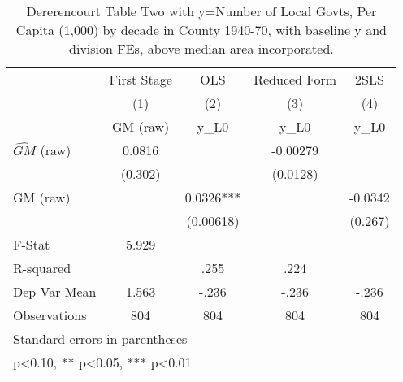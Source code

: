 \begin{table}[htbp]\centering
\def\sym#1{\ifmmode^{#1}\else\(^{#1}\)\fi}
\caption{Dererencourt Table Two with y=Number of Local Govts, Per Capita (1,000) by decade in County 1940-70, with baseline y and division FEs, above median area incorporated.}
\begin{tabular}{l*{4}{c}}
\toprule
                    & First Stage   &         OLS   &Reduced Form   &        2SLS   \\
                    &\multicolumn{1}{c}{(1)}&\multicolumn{1}{c}{(2)}&\multicolumn{1}{c}{(3)}&\multicolumn{1}{c}{(4)}\\
                    &\multicolumn{1}{c}{GM  (raw)}&\multicolumn{1}{c}{y\_L0}&\multicolumn{1}{c}{y\_L0}&\multicolumn{1}{c}{y\_L0}\\
\midrule
$\hat{GM}$ (raw)    &      0.0816   &               &    -0.00279   &               \\
                    &     (0.302)   &               &    (0.0128)   &               \\
\addlinespace
GM  (raw)           &               &      0.0326***&               &     -0.0342   \\
                    &               &   (0.00618)   &               &     (0.267)   \\
\midrule
F-Stat              &       5.929   &               &               &               \\
R-squared           &               &        .255   &        .224   &               \\
Dep Var Mean        &       1.563   &       -.236   &       -.236   &       -.236   \\
Observations        &         804   &         804   &         804   &         804   \\
\bottomrule
\multicolumn{5}{l}{\footnotesize Standard errors in parentheses}\\
\multicolumn{5}{l}{\footnotesize * p<0.10, ** p<0.05, *** p<0.01}\\
\end{tabular}
\end{table}
